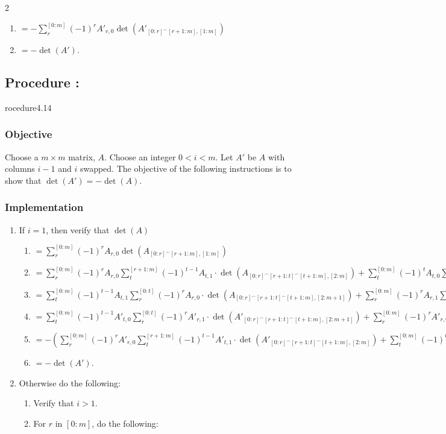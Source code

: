 \documentclass{article}
\newcounter{procedure}[part]
\newcommand{\procedure}[1]{\subsection*{Procedure \thepart:\theprocedure}\label{sec:procedure #1}\global\expandafter\edef\csname procedure#1\endcsname{\thepart:\theprocedure}\addtocounter{procedure}{1}}
\newcommand{\objective}{\subsubsection*{Objective}}
\newcommand{\implementation}{\subsubsection*{Implementation}}
\begin{document}
\begin{multicols}{2}
\begin{enumerate}
\begin{enumerate}
\begin{enumerate}
							\item $=-\sum_r^{[0:m]} (-1)^rA'_{r,0}\det(A'_{[0:r]^\frown[r+1:m],[1:m]})$
							\item $=-\det(A')$.
						\end{enumerate}
					\end{enumerate}
				\end{enumerate}
		\procedure{4.14}
			\objective
				Choose a $m\times m$ matrix, $A$. Choose an integer $0<i<m$. Let $A'$ be $A$ with columns $i-1$ and $i$ swapped. The objective of the following instructions is to show that $\det(A')=-\det(A)$.
			\implementation
				\begin{enumerate}
					\item If $i=1$, then verify that $\det(A)$
					\begin{enumerate}
						\item $=\sum_r^{[0:m]} (-1)^{r}A_{r,0}\det(A_{[0:r]^\frown[r+1:m],[1:m]})$
						\item $=\sum_r^{[0:m]} (-1)^{r}A_{r,0}\sum_t^{[r+1:m]} (-1)^{t-1}A_{t,1}\cdot\det(A_{[0:r]^\frown[r+1:t]^\frown[t+1:m],[2:m]})+\sum_t^{[0:m]} (-1)^{t}A_{t,0}\sum_r^{[0:{t}]} (-1)^{r}A_{r,1}\cdot\det(A_{[0:r]^\frown[r+1:t]^\frown[t+1:m],[2:m+1]})$
						\item $=\sum_t^{[0:m]} (-1)^{t-1}A_{t,1}\sum_r^{[0:{t}]} (-1)^{r}A_{r,0}\cdot\det(A_{[0:r]^\frown[r+1:t]^\frown[t+1:m],[2:m+1]})+\sum_r^{[0:m]} (-1)^{r}A_{r,1}\sum_t^{[r+1:m]} (-1)^{t}A_{t,0}\cdot\det(A_{[0:r]^\frown[r+1:t]^\frown[t+1:m],[2:m+1]})$
						\item $=\sum_t^{[0:m]} (-1)^{t-1}A'_{t,0}\sum_r^{[0:{t}]} (-1)^{r}A'_{r,1}\cdot\det(A'_{[0:r]^\frown[r+1:t]^\frown[t+1:m],[2:m+1]})+\sum_r^{[0:m]} (-1)^{r}A'_{r,0}\sum_t^{[r+1:m]} (-1)^{t}A'_{t,1}\cdot\det(A'_{[0:r]^\frown[r+1:t]^\frown[t+1:m],[2:m]})$
						\item $=-(\sum_r^{[0:m]} (-1)^{r}A'_{r,0}\sum_t^{[r+1:m]} (-1)^{t-1}A'_{t,1}\cdot\det(A'_{[0:r]^\frown[r+1:t]^\frown[t+1:m],[2:m]})+\sum_t^{[0:m]} (-1)^{t}A'_{t,0}\sum_r^{[0:{t}]} (-1)^{r}A'_{r,1}\cdot\det(A'_{[0:r]^\frown[r+1:t]^\frown[t+1:m],[2:m]}))$
						\item $=-\det(A')$.
					\end{enumerate}
					\item Otherwise do the following:
					\begin{enumerate}
						\item Verify that $i>1$.
						\item For $r$ in $[0:m]$, do the following:
						\begin{enumerate}

\end{enumerate}
\end{enumerate}
\end{enumerate}
\end{multicols}
\end{document}
